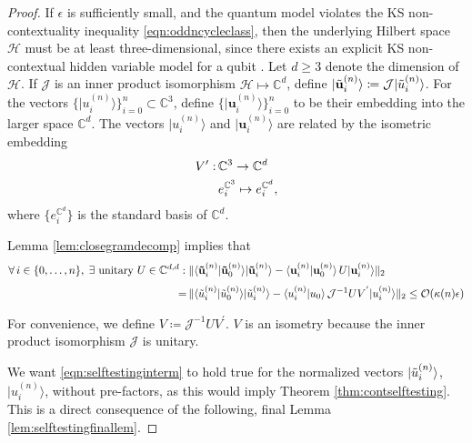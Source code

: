 \begin{proof}
If $\epsilon$ is sufficiently small, and the quantum model violates the KS non-contextuality inequality \ref{eqn:oddncycleclass}, then the underlying Hilbert space $\mathcal{H}$ must be at least three-dimensional, since there exists an explicit KS non-contextual hidden variable model for a qubit \cite{Mermin1993}. Let $d\geq3$ denote the dimension of $\mathcal{H}$. If $\mathcal{J}$ is an inner product isomorphism $\mathcal{H}\mapsto\mathbb{C}^d$, define $\vert \Tilde{\mathbf{u}}_i^{(n)}\rangle \coloneqq \mathcal{J} \vert \Tilde{u}_i^{(n)}\rangle$.
For the vectors $\{\vert u_i^{(n)}\rangle \}_{i=0}^n\subset\mathbb{C}^3$, define $\{\vert \mathbf{u}_i^{(n)}\rangle \}_{i=0}^n$ to be their embedding into the larger space $\mathbb{C}^d$. The vectors $\vert u_i^{(n)}\rangle$ and $\vert \mathbf{u}_i^{(n)}\rangle$ are related by the isometric embedding 
\begin{align*}
    V':\thinspace & \mathbb{C}^3\rightarrow\mathbb{C}^d \\
    & e_i^{\mathbb{C}^3} \mapsto e_i^{\mathbb{C}^d},
\end{align*}
where $\{e_i^{\mathbb{C}^d}\}$ is the standard basis of $\mathbb{C}^d$.

Lemma \ref{lem:closegramdecomp} implies that 
\begin{align}
\label{eqn:selftestinginterm}
\begin{split}
    \forall\thinspace i\in\{0,\dots,n\},\; \exists \text{ unitary } U\in\mathbb{C}^{d,d}: \; & \| \langle \mathbf{\Tilde{u}}_i^{(n)} \vert \mathbf{\Tilde{u}}_0^{(n)} \rangle \vert \mathbf{\Tilde{u}}_i^{(n)} \rangle - \langle \mathbf{u}_i^{(n)} \vert \mathbf{u}_0^{(n)} \rangle \thinspace U\vert \mathbf{u}_i^{(n)}\rangle\|_2 \\[0.3em]
    = \thinspace & \| \langle \Tilde{u}_i^{(n)} \vert \Tilde{u}_0^{(n)} \rangle \vert \Tilde{u}_i^{(n)} \rangle - \langle u_i^{(n)} \vert u_0 \rangle \thinspace \mathcal{J}^{-1}UV^{'} \vert u_i^{(n)}\rangle\|_2 \leq \mathcal{O}(\kappa(n)\epsilon)
\end{split}
\end{align}

For convenience, we define $V\coloneqq \mathcal{J}^{-1}UV^{'}$. $V$ is an isometry because the inner product isomorphism $\mathcal{J}$ is unitary. 

We want \ref{eqn:selftestinginterm} to hold true for the normalized vectors $\vert \Tilde{u}_i^{(n)} \rangle$, $\vert u_i^{(n)}\rangle$, without pre-factors, as this would imply Theorem \ref{thm:contselftesting}. This is a direct consequence of the following, final Lemma \ref{lem:selftestingfinallem}.
\end{proof}

